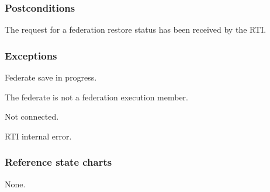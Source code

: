 \subsubsection{Postconditions}

\begin{stdalphalist}
    \item The request for a federation restore status has been received by the RTI.
\end{stdalphalist}

\subsubsection{Exceptions}

\begin{stdalphalist}
    \item Federate save in progress.
    \item The federate is not a federation execution member.
    \item Not connected.
    \item RTI internal error.
\end{stdalphalist}

\subsubsection{Reference state charts}

\begin{stdalphalist}
    \item None.
\end{stdalphalist}

\clearpage

